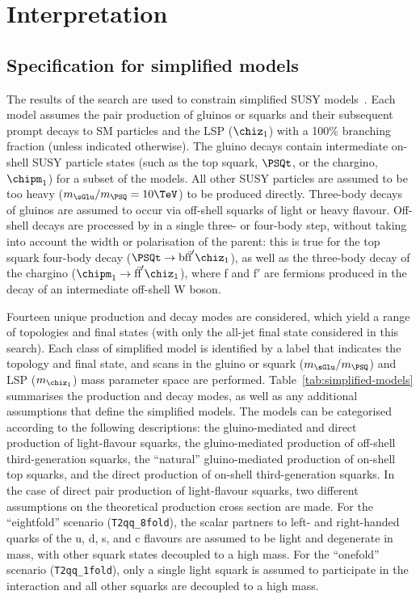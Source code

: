 \clearpage
\section{Interpretation} 
\label{sec:interpretations}

\subsection{Specification for simplified models} 

The results of the search are used to constrain simplified
SUSY models~\cite{Alwall:2008ag, Alwall:2008va, sms}. Each
model assumes the pair production of gluinos or squarks and their
subsequent prompt decays to SM particles and the LSP ($\chiz_1$) with
a 100\% branching fraction (unless indicated otherwise). The gluino
decays contain intermediate on-shell SUSY particle states (such as the top
squark, $\PSQt$, or the chargino, $\chipm_1$) for a subset of the
models. All other SUSY particles are assumed to be too heavy ($m_{\sGlu} /
m_{\PSQ} = 10\TeV$) to be produced directly. Three-body decays of
gluinos are assumed to occur via off-shell squarks of light or heavy
flavour. Off-shell decays are processed by \PYTHIA in a single three-
or four-body step, without taking into account the width or
polarisation of the parent: this is true for the top squark four-body
decay ($\PSQt \ra \text{bf}\bar{\text{f}}'\chiz_1$), as well as the
three-body decay of the chargino ($\chipm_1 \ra
\text{f}\bar{\text{f}}'\chiz_1$), where f and f$'$ are fermions
produced in the decay of an intermediate off-shell W boson. 

Fourteen unique production and decay modes are considered, which yield
a range of topologies and final states (with only the all-jet final
state considered in this search). Each class of simplified model is
identified by a label that indicates the topology and final state, and
scans in the gluino or squark ($m_{\sGlu} / m_{\PSQ}$) and LSP
($m_{\chiz_1}$) mass parameter space are performed.
Table~\ref{tab:simplified-models} summarises the production and decay
modes, as well as any additional assumptions that define the
simplified models. The models can be categorised according to the
following descriptions: the gluino-mediated and direct production of
light-flavour squarks, the gluino-mediated production of off-shell
third-generation squarks, the ``natural'' gluino-mediated production
of on-shell top squarks, and the direct production of on-shell
third-generation squarks. In the case of direct pair production of
light-flavour squarks, two different assumptions on the theoretical 
production cross section are made. For the ``eightfold'' scenario
(\texttt{T2qq\_8fold}), the scalar partners to left- and right-handed
quarks of the u, d, s, and c flavours are assumed to be light and
degenerate in mass, with other squark states decoupled to a high
mass. For the ``onefold'' scenario (\texttt{T2qq\_1fold}), only a
single light squark is assumed to participate in the interaction and
all other squarks are decoupled to a high mass.

